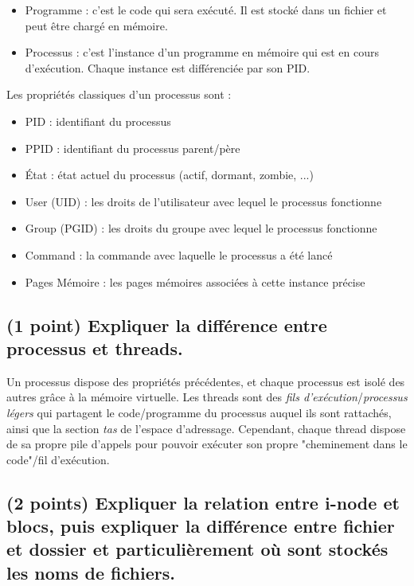 \documentclass[11pt,a4paper]{article}
\begin{document}
\bigskip
\begin{itemize}
\item Programme : c'est le code qui sera exécuté. Il est stocké dans un fichier et peut être chargé en mémoire.\\
\item Processus : c'est l'instance d'un programme en mémoire qui est en cours d'exécution. Chaque instance est différenciée par son PID.\\
\end{itemize}

Les propriétés classiques d'un processus sont :
\begin{itemize}
\item PID : identifiant du processus
\item PPID : identifiant du processus parent/père
\item \'Etat : état actuel du processus (actif, dormant, zombie, ...)
\item User (UID) : les droits de l'utilisateur avec lequel le processus fonctionne
\item Group (PGID) : les droits du groupe avec lequel le processus fonctionne
\item Command : la commande avec laquelle le processus a été lancé
\item Pages Mémoire : les pages mémoires associées à cette instance précise
\end{itemize}
\bigskip


\subsection{(1 point) Expliquer la différence entre processus et threads.}

\bigskip
Un processus dispose des propriétés précédentes, et chaque processus est isolé des autres grâce à la mémoire virtuelle.
Les threads sont des \textit{fils d'exécution}/\textit{processus légers} qui partagent le code/programme du processus auquel ils sont rattachés, ainsi que la section \textit{tas} de l'espace d'adressage.
Cependant, chaque thread dispose de sa propre pile d'appels pour pouvoir exécuter son propre "cheminement dans le code"/fil d'exécution.\\
\bigskip

\subsection{(2 points) Expliquer la relation entre i-node et blocs, puis expliquer la différence entre fichier et dossier et particulièrement où sont stockés les noms de fichiers.}
\end{document}
